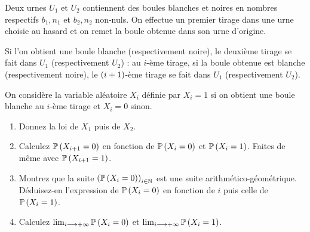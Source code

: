 \begin{exoss}
Deux urnes \(U_1\) et \(U_2\) contiennent des boules blanches et noires en nombres respectifs \(b_1,n_1\) et \(b_2,n_2\) non-nuls. On effectue un premier tirage dans une urne choisie au hasard et on remet la boule obtenue dans son urne d'origine.

Si l'on obtient une boule blanche (respectivement noire), le deuxième tirage se fait dans \(U_1\) (respectivement \(U_2\)) : au \(i\)-ème tirage, si la boule obtenue est blanche (respectivement noire), le \(\left(i+1\right)\)-ème tirage se fait dans \(U_1\) (respectivement \(U_2\)).

On considère la variable aléatoire \(X_i\) définie par \(X_i=1\) si on obtient une boule blanche au \(i\)-ème tirage et \(X_i=0\) sinon.

\begin{enumerate}
    \item Donnez la loi de \(X_1\) puis de \(X_2\). \\
    \item Calculez \(\mathbb{P}\left(X_{i+1}=0\right)\) en fonction de \(\mathbb{P}\left(X_i=0\right)\) et \(\mathbb{P}\left(X_i=1\right)\). Faites de même avec \(\mathbb{P}\left(X_{i+1}=1\right)\). \\
    \item Montrez que la suite \(\left(\mathbb{P}\left(X_i=0\right)\right)_{i\in\mathbb{N}}\) est une suite arithmético-géométrique. Déduisez-en l'expression de \(\mathbb{P}\left(X_i=0\right)\) en fonction de \(i\) puis celle de \(\mathbb{P}\left(X_i=1\right)\). \\
    \item Calculez \(\lim_{i\longrightarrow+\infty}\mathbb{P}\left(X_i=0\right)\) et \(\lim_{i\longrightarrow+\infty}\mathbb{P}\left(X_i=1\right)\).
\end{enumerate}
\end{exoss}

